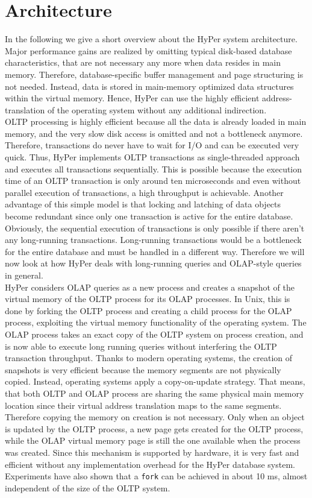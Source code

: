 \section{Architecture}
In the following we give a short overview about the HyPer system architecture. Major performance gains are realized by omitting typical disk-based database characteristics, that are not necessary any more when data resides in main memory. Therefore, database-specific buffer management and page structuring is not needed. Instead, data is stored in main-memory optimized data structures within the virtual memory. Hence, HyPer can use the highly efficient address-translation of the operating system without any additional indirection.
\\
OLTP processing is highly efficient because all the data is already loaded in main memory, and the very slow disk access is omitted and not a bottleneck anymore. Therefore, transactions do never have to wait for I/O and can be executed very quick. Thus, HyPer implements OLTP transactions as single-threaded approach and executes all transactions sequentially. This is possible because the execution time of an OLTP transaction is only around ten microseconds and even without parallel execution of transactions, a high throughput is achievable. Another advantage of this simple model is that locking and latching of data objects become redundant since only one transaction is active for the entire database.
\\
Obviously, the sequential execution of transactions is only possible if there aren’t any long-running transactions. Long-running transactions would be a bottleneck for the entire database and must be handled in a different way. Therefore we will now look at how HyPer deals with long-running queries and OLAP-style queries in general.
\\
HyPer considers OLAP queries as a new process and creates a snapshot of the virtual memory of the OLTP process for its OLAP processes. In Unix, this is done by forking the OLTP process and creating a child process for the OLAP process, exploiting the virtual memory functionality of the operating system. The OLAP process takes an exact copy of the OLTP system on process creation, and is now able to execute long running queries without interfering the OLTP transaction throughput. Thanks to modern operating systems, the creation of snapshots is very efficient because the memory segments are not physically copied. Instead, operating systems apply a copy-on-update strategy. That means, that both OLTP and OLAP process are sharing the same physical main memory location since their virtual address translation maps to the same segments. Therefore copying the memory on creation is not necessary. Only when an object is updated by the OLTP process, a new page gets created for the OLTP process, while the OLAP virtual memory page is still the one available when the process was created. Since this mechanism is supported by hardware, it is very fast and efficient without any implementation overhead for the HyPer database system. Experiments have also shown that a \texttt{fork} can be achieved in about 10 ms, almost independent of the size of the OLTP system.
